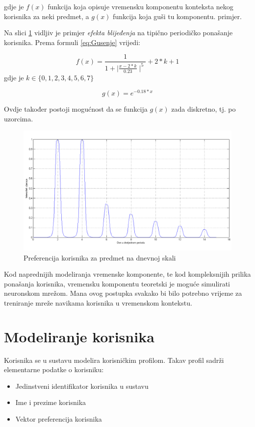 \documentclass[times, utf8, diplomski, numeric]{fer}
\begin{document}
gdje je $f(x)$ funkcija koja opisuje vremensku komponentu konteksta nekog
korisnika za neki predmet, a $g(x)$ funkcija koja guši tu komponentu.
primjer. 

Na slici \ref{fig:GaussPriguseno} vidljiv je primjer \emph{efekta
blijeđenja} na tipično periodičko ponašanje korisnika. Prema formuli
\ref{eq:Gusenje} vrijedi:

\begin{equation}
	\label{eq:BellFunc}
	f(x) = \frac
	{
		1
	}
	{
		1 + \mid\frac{x - 2*k}{0.23}\mid^{5}
	}
	+ 2 \ast k + 1
\end{equation}
gdje je $k \in \{ 0, 1, 2, 3, 4, 5, 6, 7 \}$

\begin{equation}
	\label{eq:Prigusnica}
	g(x)=e^{-0.18 * x}
\end{equation}

Ovdje također postoji mogućnost da se funkcija $g(x)$ zada diskretno, tj. po
uzorcima.

\begin{figure}[H]
	\centering
	\includegraphics[width=14.21cm]{images/prigusenocropped.png}
	\caption{Preferencija korisnika za predmet na dnevnoj skali}
	\label{fig:GaussPriguseno}
\end{figure}

Kod naprednijih modeliranja vremenske komponente, te kod kompleksnijih prilika
ponašanja korisnika, vremensku komponentu teoretski je moguće simulirati
neuronskom mrežom. Mana ovog postupka svakako bi bilo potrebno vrijeme za
treniranje mreže navikama korisnika u vremenskom kontekstu.

\section{Modeliranje korisnika}
Korisnika se u sustavu modelira korisničkim profilom. Takav profil sadrži
elementarne podatke o korisniku:
\begin{itemize}
  \item Jedinstveni identifikator korisnika u sustavu
  \item Ime i prezime korisnika
  \item Vektor preferencija korisnika
\end{itemize}
\end{document}
